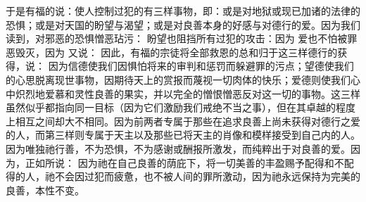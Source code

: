 于是有福的说：使人控制过犯的有三样事物，即：或是对地狱或现已加诸的法律的恐惧；或是对天国的盼望与渴望；或是对良善本身的好感与对德行的爱。因为我们读到，对邪恶的恐惧憎恶玷污： 盼望也阻挡所有过犯的攻击：因为 爱也不怕被罪恶毁灭，因为 又说： 因此，有福的宗徒将全部救恩的总和归于这三样德行的获得，说： 因为信德使我们因惧怕将来的审判和惩罚而躲避罪的污点；望德使我们的心思脱离现世事物，因期待天上的赏报而蔑视一切肉体的快乐；爱德则使我们心中炽烈地爱慕和灵性良善的果实，并以完全的憎恨憎恶反对这一切的事物。这三样虽然似乎都指向同一目标（因为它们激励我们戒绝不当之事），但在其卓越的程度上相互之间却大不相同。因为前两者专属于那些在追求良善上尚未获得对德行之爱的人，而第三样则专属于天主以及那些已将天主的肖像和模样接受到自己内的人。因为唯独祂行善，不为恐惧，不为感谢或酬报所激发，而纯粹出于对良善的爱。因为，正如所说： 因为祂在自己良善的荫庇下，将一切美善的丰盈赐予配得和不配得的人，祂不会因过犯而疲惫，也不被人间的罪所激动，因为祂永远保持为完美的良善，本性不变。\par


\subsection{}

\par

